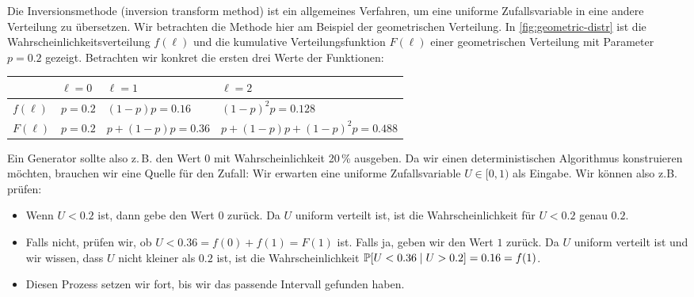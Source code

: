 Die  Inversionsmethode (inversion transform method) ist ein allgemeines Verfahren, um eine uniforme Zufallsvariable in eine andere Verteilung zu übersetzen.
Wir betrachten die Methode hier am Beispiel der geometrischen Verteilung.
In \cref{fig:geometric-distr} ist die Wahrscheinlichkeitsverteilung $f(\ell)$ und die kumulative Verteilungsfunktion $F(\ell)$ einer geometrischen Verteilung mit Parameter $p = 0.2$ gezeigt.
%
Betrachten wir konkret die ersten drei Werte der Funktionen:

\begin{center}
    \begin{tabular}{l|p{}p{}p{}}
                  & $\ell = 0$ & $\ell = 1$              & $\ell = 2$                              \\\hline\hline
        $f(\ell)$ & $p =0.2$   & $(1 {-} p)p = 0.16$     & $(1 {-} p)^2p = 0.128$                  \\
        $F(\ell)$ & $p =0.2$   & $p{+}(1 {-} p)p = 0.36$ & $p{+}(1 {-} p)p{+}(1 {-} p)^2p = 0.488$
    \end{tabular}
\end{center}
\vspace{1em}

Ein Generator sollte also z.\,B. den Wert $0$ mit Wahrscheinlichkeit 20\,\% ausgeben.
Da wir einen deterministischen Algorithmus konstruieren möchten, brauchen wir eine Quelle für den Zufall:
Wir erwarten eine uniforme Zufallsvariable $U \in [0, 1)$ als Eingabe.
Wir können also z.B. prüfen:
\begin{itemize}
    \item Wenn $U < 0.2$ ist, dann gebe den Wert $0$ zurück.
          Da $U$ uniform verteilt ist, ist die Wahrscheinlichkeit für $U < 0.2$ genau $0.2$.

    \item Falls nicht, prüfen wir, ob $U < 0.36 = f(0) + f(1) = F(1)$ ist. Falls ja, geben wir den Wert $1$ zurück.
          Da $U$ uniform verteilt ist und wir wissen, dass $U$ nicht kleiner als $0.2$ ist, ist die Wahrscheinlichkeit $\mathbb{P}\!\left[U < 0.36 \mid U > 0.2\right] = 0.16 = f(1)$.

    \item Diesen Prozess setzen wir fort, bis wir das passende Intervall gefunden haben.
\end{itemize}

